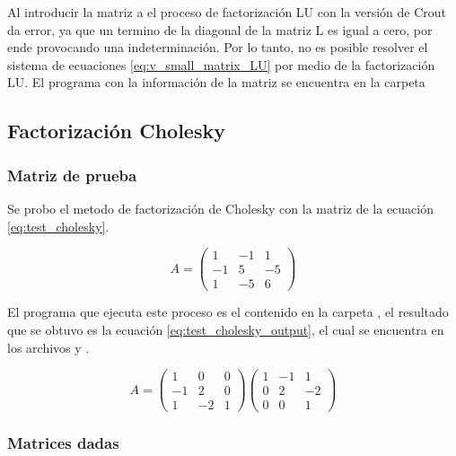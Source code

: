 Al introducir la matriz a el proceso de factorización LU con la versión de Crout da error, ya que un termino de la diagonal de la matriz L es igual a cero, por ende provocando una indeterminación. Por lo tanto, no es posible resolver el sistema de ecuaciones \ref{eq:v_small_matrix_LU} por medio de la factorización LU. El programa con la información de la matriz se encuentra en la carpeta 


\subsection{Factorización Cholesky}

\subsubsection{Matriz de prueba}

Se probo el metodo de factorización de Cholesky con la matriz de la ecuación \ref{eq:test_cholesky}.

\begin{equation}
    A= \begin{pmatrix}
        1  & -1 & 1  \\
        -1 & 5  & -5 \\
        1  & -5 & 6
    \end{pmatrix}
    \label{eq:test_cholesky}
\end{equation}

El programa que ejecuta este proceso es el contenido en la carpeta , el resultado que se obtuvo es la ecuación \ref{eq:test_cholesky_output}, el cual se encuentra en los archivos  y .

\begin{equation}
    A = \begin{pmatrix}
        1  & 0  & 0 \\
        -1 & 2  & 0 \\
        1  & -2 & 1
    \end{pmatrix}
    \begin{pmatrix}
        1 & -1 & 1  \\
        0 & 2  & -2 \\
        0 & 0  & 1
    \end{pmatrix}
    \label{eq:test_cholesky_output}
\end{equation}

\subsubsection{Matrices dadas \label{sec:cholesky}}

